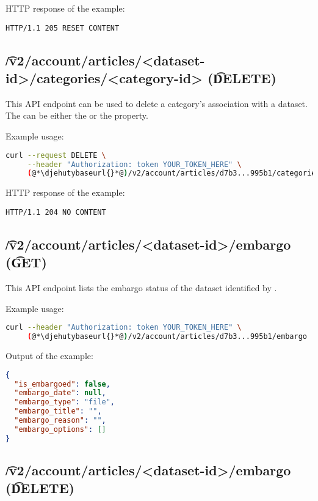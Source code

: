   HTTP response of the example:
\begin{lstlisting}
HTTP/1.1 205 RESET CONTENT
\end{lstlisting}

\subsection{\t{/v2/account/articles/<dataset-id>/categories/<category-id>} (\t{DELETE})}

  This API endpoint can be used to delete a category's association with a dataset.
  The  can be either the  or the  property.

  Example usage:
\begin{lstlisting}[language=bash]
curl --request DELETE \
     --header "Authorization: token YOUR_TOKEN_HERE" \
     (@*\djehutybaseurl{}*@)/v2/account/articles/d7b3...995b1/categories/5c61...b668
\end{lstlisting}

  HTTP response of the example:
\begin{lstlisting}
HTTP/1.1 204 NO CONTENT
\end{lstlisting}

\subsection{\t{/v2/account/articles/<dataset-id>/embargo} (\t{GET})}

  This API endpoint lists the embargo status of the dataset identified by .

  Example usage:
\begin{lstlisting}[language=bash]
curl --header "Authorization: token YOUR_TOKEN_HERE" \
     (@*\djehutybaseurl{}*@)/v2/account/articles/d7b3...995b1/embargo | jq
\end{lstlisting}

  Output of the example:
\begin{lstlisting}[language=JSON]
{
  "is_embargoed": false,
  "embargo_date": null,
  "embargo_type": "file",
  "embargo_title": "",
  "embargo_reason": "",
  "embargo_options": []
}
\end{lstlisting}

\subsection{\t{/v2/account/articles/<dataset-id>/embargo} (\t{DELETE})}


